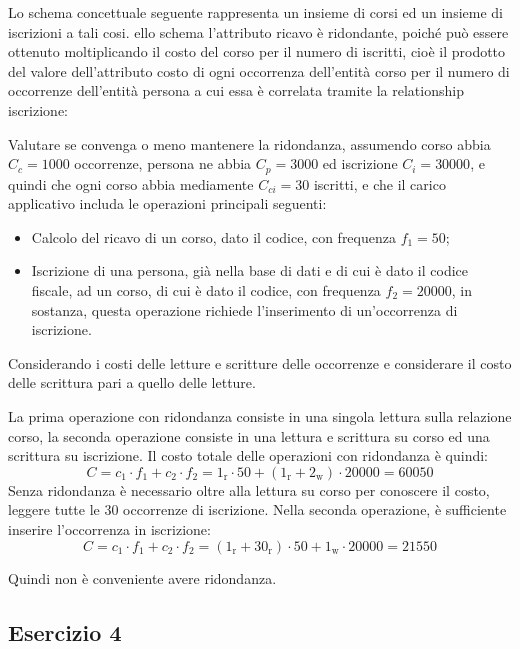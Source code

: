 \documentclass{article}
\numberwithin{equation}{subsection}
\begin{document}

Lo schema concettuale seguente rappresenta un insieme di corsi ed un insieme di iscrizioni a tali cosi. ello schema l'attributo ricavo è 
ridondante, poiché può essere ottenuto moltiplicando il costo del corso per il numero di iscritti, cioè il prodotto del valore dell'attributo costo di ogni 
occorrenza dell'entità corso per il numero di occorrenze dell'entità persona a cui essa è correlata tramite la relationship iscrizione:

Valutare se convenga o meno mantenere la ridondanza, assumendo corso abbia $C_c=1000$ occorrenze, persona ne abbia $C_p=3000$ ed iscrizione 
$C_i=30000$, e quindi che ogni corso abbia mediamente $C_{ci}=30$ iscritti, e che il carico applicativo includa le operazioni principali seguenti:
\begin{itemize}
    \item Calcolo del ricavo di un corso, dato il codice, con frequenza $f_1=50$;
    \item Iscrizione di una persona, già nella base di dati e di cui è dato il codice fiscale, ad un corso, di cui è dato il codice, con 
    frequenza $f_2=20000$, in sostanza, questa operazione richiede l'inserimento di un'occorrenza di iscrizione. 
\end{itemize}

Considerando i costi delle letture e scritture delle occorrenze e considerare il costo delle scrittura pari a quello delle letture. 


La prima operazione con ridondanza consiste in una singola lettura sulla relazione corso, la seconda operazione consiste in una 
lettura e scrittura su corso ed una scrittura su iscrizione. Il costo totale delle operazioni con ridondanza è quindi:
\begin{equation*}
    C=c_1\cdot f_1+c_2\cdot f_2=1_{\mathrm{r}}\cdot50+(1_{\mathrm{r}}+2_{\mathrm{w}})\cdot20000=60050
\end{equation*}
Senza ridondanza è necessario oltre alla lettura su corso per conoscere il costo, leggere tutte le 30 occorrenze di iscrizione. Nella seconda operazione, 
è sufficiente inserire l'occorrenza in iscrizione:
\begin{equation*}
    C=c_1\cdot f_1+c_2\cdot f_2=(1_{\mathrm{r}}+30_\mathrm{r})\cdot50+1_\mathrm{w}\cdot20000=21550
\end{equation*}

Quindi non è conveniente avere ridondanza. 

\subsection{Esercizio 4}


\end{document}
